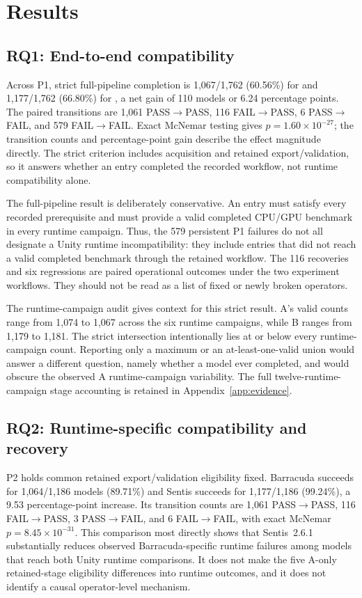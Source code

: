 \section{Results}
\label{sec:results}

\subsection{RQ1: End-to-end compatibility}
Across P1, strict full-pipeline completion is 1,067/1,762 (60.56\%) for \A and 1,177/1,762 (66.80\%) for \B, a net gain of 110 models or 6.24 percentage points. The paired transitions are 1,061 PASS$\rightarrow$PASS, 116 FAIL$\rightarrow$PASS, 6 PASS$\rightarrow$FAIL, and 579 FAIL$\rightarrow$FAIL. Exact McNemar testing gives $p=1.60\times10^{-27}$; the transition counts and percentage-point gain describe the effect magnitude directly. The strict criterion includes acquisition and retained export/validation, so it answers whether an entry completed the recorded workflow, not runtime compatibility alone.

The full-pipeline result is deliberately conservative. An entry must satisfy every recorded prerequisite and must provide a valid completed CPU/GPU benchmark in every runtime campaign. Thus, the 579 persistent P1 failures do not all designate a Unity runtime incompatibility: they include entries that did not reach a valid completed benchmark through the retained workflow. The 116 recoveries and six regressions are paired operational outcomes under the two experiment workflows. They should not be read as a list of fixed or newly broken operators.

The runtime-campaign audit gives context for this strict result. A's valid counts range from 1,074 to 1,067 across the six runtime campaigns, while B ranges from 1,179 to 1,181. The strict intersection intentionally lies at or below every runtime-campaign count. Reporting only a maximum or an at-least-one-valid union would answer a different question, namely whether a model ever completed, and would obscure the observed A runtime-campaign variability. The full twelve-runtime-campaign stage accounting is retained in Appendix~\ref{app:evidence}.

\TransitionFigure

\subsection{RQ2: Runtime-specific compatibility and recovery}
P2 holds common retained export/validation eligibility fixed. Barracuda succeeds for 1,064/1,186 models (89.71\%) and Sentis succeeds for 1,177/1,186 (99.24\%), a 9.53 percentage-point increase. Its transition counts are 1,061 PASS$\rightarrow$PASS, 116 FAIL$\rightarrow$PASS, 3 PASS$\rightarrow$FAIL, and 6 FAIL$\rightarrow$FAIL, with exact McNemar $p=8.45\times10^{-31}$. This comparison most directly shows that Sentis~2.6.1 substantially reduces observed Barracuda-specific runtime failures among models that reach both Unity runtime comparisons. It does not make the five A-only retained-stage eligibility differences into runtime outcomes, and it does not identify a causal operator-level mechanism.


